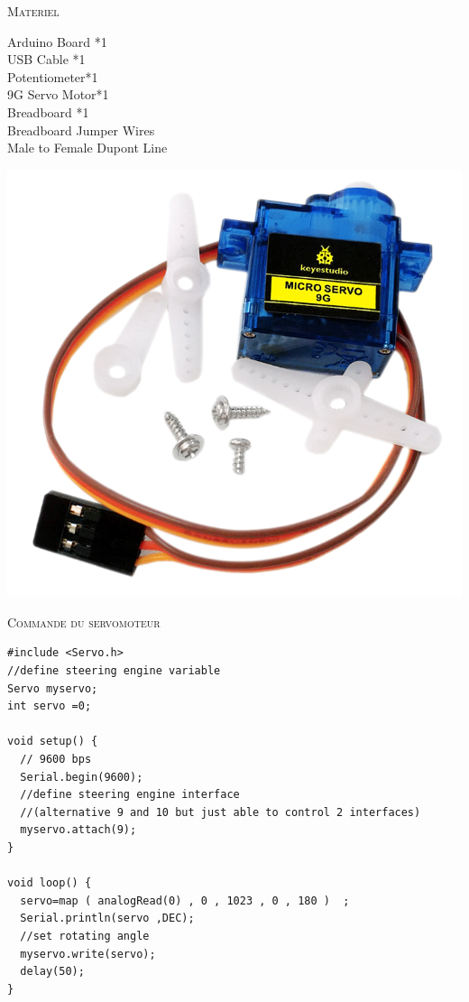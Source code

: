 \documentclass[a4paper, 11pt]{article}           %
\newcommand{\partie}[1]{\textsc{\Large #1} }
\begin{document}
\partie{Materiel} \\                      %
\begin{minipage}{.65\textwidth} %
\begin{multicols}{2}
Arduino Board *1\\
USB Cable *1\\
Potentiometer*1 \\
9G Servo Motor*1 \\
Breadboard *1\\
Breadboard Jumper Wires \\
Male to Female Dupont Line\\
\end{multicols}
\end{minipage}
\begin{minipage}{.25\textwidth} %
\begin{center}
\includegraphics[width=\textwidth]{servo}
\end{center}
\end{minipage}

\partie{Commande du servomoteur} %
\begin{lstlisting}
#include <Servo.h>
//define steering engine variable
Servo myservo;
int servo =0;

void setup() {
  // 9600 bps
  Serial.begin(9600);
  //define steering engine interface
  //(alternative 9 and 10 but just able to control 2 interfaces)
  myservo.attach(9);
}

void loop() {
  servo=map ( analogRead(0) , 0 , 1023 , 0 , 180 )  ;
  Serial.println(servo ,DEC);
  //set rotating angle
  myservo.write(servo);
  delay(50);
}
\end{lstlisting}
\end{document}
